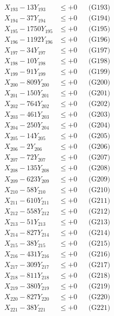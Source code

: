 \documentclass[a4paper,10pt]{article}
\begin{document}
{\begin{align}
X_{193} - 13Y_{193} &\leq +0 && \text{(G193)} \\
X_{194} - 37Y_{194} &\leq +0 && \text{(G194)} \\
X_{195} - 1750Y_{195} &\leq +0 && \text{(G195)} \\
X_{196} - 1192Y_{196} &\leq +0 && \text{(G196)} \\
X_{197} - 34Y_{197} &\leq +0 && \text{(G197)} \\
X_{198} - 10Y_{198} &\leq +0 && \text{(G198)} \\
X_{199} - 91Y_{199} &\leq +0 && \text{(G199)} \\
X_{200} - 809Y_{200} &\leq +0 && \text{(G200)} \\
\allowbreak
X_{201} - 150Y_{201} &\leq +0 && \text{(G201)} \\
X_{202} - 764Y_{202} &\leq +0 && \text{(G202)} \\
X_{203} - 461Y_{203} &\leq +0 && \text{(G203)} \\
X_{204} - 250Y_{204} &\leq +0 && \text{(G204)} \\
X_{205} - 14Y_{205} &\leq +0 && \text{(G205)} \\
X_{206} - 2Y_{206} &\leq +0 && \text{(G206)} \\
X_{207} - 72Y_{207} &\leq +0 && \text{(G207)} \\
X_{208} - 135Y_{208} &\leq +0 && \text{(G208)} \\
X_{209} - 623Y_{209} &\leq +0 && \text{(G209)} \\
X_{210} - 58Y_{210} &\leq +0 && \text{(G210)} \\
\allowbreak
X_{211} - 610Y_{211} &\leq +0 && \text{(G211)} \\
X_{212} - 558Y_{212} &\leq +0 && \text{(G212)} \\
X_{213} - 51Y_{213} &\leq +0 && \text{(G213)} \\
X_{214} - 827Y_{214} &\leq +0 && \text{(G214)} \\
X_{215} - 38Y_{215} &\leq +0 && \text{(G215)} \\
X_{216} - 431Y_{216} &\leq +0 && \text{(G216)} \\
X_{217} - 309Y_{217} &\leq +0 && \text{(G217)} \\
X_{218} - 811Y_{218} &\leq +0 && \text{(G218)} \\
X_{219} - 380Y_{219} &\leq +0 && \text{(G219)} \\
X_{220} - 827Y_{220} &\leq +0 && \text{(G220)} \\
\allowbreak
X_{221} - 38Y_{221} &\leq +0 && \text{(G221)} \\

\end{align}}
\end{document}
